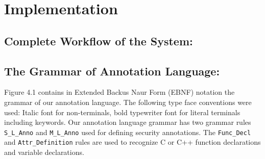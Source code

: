\chapter{Implementation}

\section{Complete Workflow of the System:}




\section{The Grammar of Annotation Language:}
Figure 4.1 contains in Extended Backus Naur Form (EBNF) notation the grammar of our annotation language. The following type face conventions were used: Italic font for non-terminals, bold typewriter font for literal terminals including keywords.
Our annotation language grammar has two grammar rules
\texttt{S\_L\_Anno} and \texttt{M\_L\_Anno} used for defining security annotations. The \texttt{Func\_Decl} and \texttt{Attr\_Definition} rules are
used to recognize C or C++ function declarations and variable
declarations.

